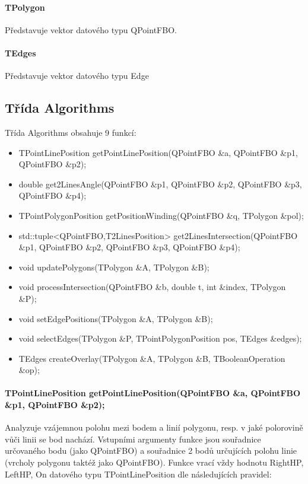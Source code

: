 \documentclass[11pt]{article}
\begin{document}
\paragraph{TPolygon}
Představuje vektor datového typu QPointFBO.

\paragraph{TEdges}
Představuje vektor datového typu Edge

\subsection{Třída Algorithms}
Třída Algorithms obsahuje 9 funkcí:  

\begin{itemize}
	\item TPointLinePosition getPointLinePosition(QPointFBO \&a, QPointFBO \&p1, QPointFBO \&p2);
	\item double get2LinesAngle(QPointFBO \&p1, QPointFBO \&p2, QPointFBO \&p3, QPointFBO \&p4);
	\item TPointPolygonPosition getPositionWinding(QPointFBO \&q, TPolygon \&pol);
	\item std::tuple<QPointFBO,T2LinesPosition> get2LinesIntersection(QPointFBO \&p1, QPointFBO \&p2, QPointFBO \&p3, QPointFBO \&p4);
	\item void updatePolygons(TPolygon \&A, TPolygon \&B);
	\item void processIntersection(QPointFBO \&b, double t, int \&index, TPolygon \&P);
	\item void setEdgePositions(TPolygon \&A, TPolygon \&B);
	\item void selectEdges(TPolygon \&P, TPointPolygonPosition pos, TEdges \&edges);
	\item TEdges createOverlay(TPolygon \&A, TPolygon \&B, TBooleanOperation \&op);

\end{itemize}

\paragraph{TPointLinePosition getPointLinePosition(QPointFBO \&a, QPointFBO \&p1, QPointFBO \&p2);}
Analyzuje vzájemnou polohu mezi bodem a linií polygonu, resp. v jaké polorovině vůči linii se bod nachází. Vstupními argumenty funkce jsou souřadnice určovaného bodu (jako QPointFBO) a souřadnice 2 bodů určujících polohu linie (vrcholy polygonu taktéž jako QPointFBO). Funkce vrací vždy hodnotu RightHP, LeftHP, On datového typu TPointLinePosition dle následujících pravidel:
\end{document}
